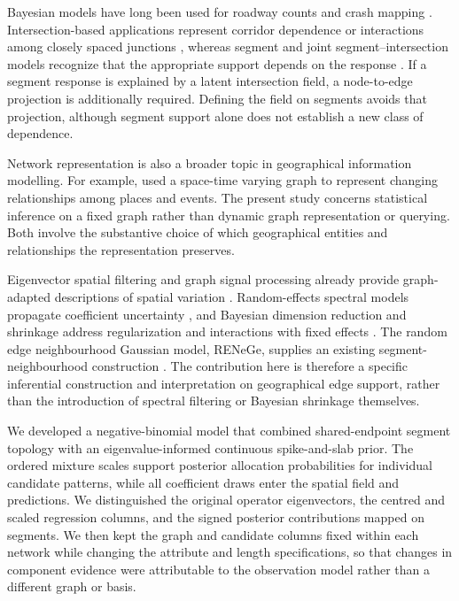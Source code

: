 \documentclass[11pt]{article}
\begin{document}
Bayesian models have long been used for roadway counts and crash mapping \citep{song2006,aguerovalverde2008}. Intersection-based applications represent corridor dependence or interactions among closely spaced junctions \citep{guo2010,xie2014}, whereas segment and joint segment--intersection models recognize that the appropriate support depends on the response \citep{aguerovalverde2008,zenghuang2014}. If a segment response is explained by a latent intersection field, a node-to-edge projection is additionally required. Defining the field on segments avoids that projection, although segment support alone does not establish a new class of dependence.

Network representation is also a broader topic in geographical information modelling. For example, \citet{maduako2019} used a space-time varying graph to represent changing relationships among places and events. The present study concerns statistical inference on a fixed graph rather than dynamic graph representation or querying. Both involve the substantive choice of which geographical entities and relationships the representation preserves.

Eigenvector spatial filtering and graph signal processing already provide graph-adapted descriptions of spatial variation \citep{griffith2003,griffith2019,shuman2013}. Random-effects spectral models propagate coefficient uncertainty \citep{murakami2015}, and Bayesian dimension reduction and shrinkage address regularization and interactions with fixed effects \citep{hughes2013,donegan2020}. The random edge neighbourhood Gaussian model, RENeGe, supplies an existing segment-neighbourhood construction \citep{cruzreyes2023spasta}. The contribution here is therefore a specific inferential construction and interpretation on geographical edge support, rather than the introduction of spectral filtering or Bayesian shrinkage themselves.

We developed a negative-binomial model that combined shared-endpoint segment topology with an eigenvalue-informed continuous spike-and-slab prior. The ordered mixture scales support posterior allocation probabilities for individual candidate patterns, while all coefficient draws enter the spatial field and predictions. We distinguished the original operator eigenvectors, the centred and scaled regression columns, and the signed posterior contributions mapped on segments. We then kept the graph and candidate columns fixed within each network while changing the attribute and length specifications, so that changes in component evidence were attributable to the observation model rather than a different graph or basis.
\end{document}

